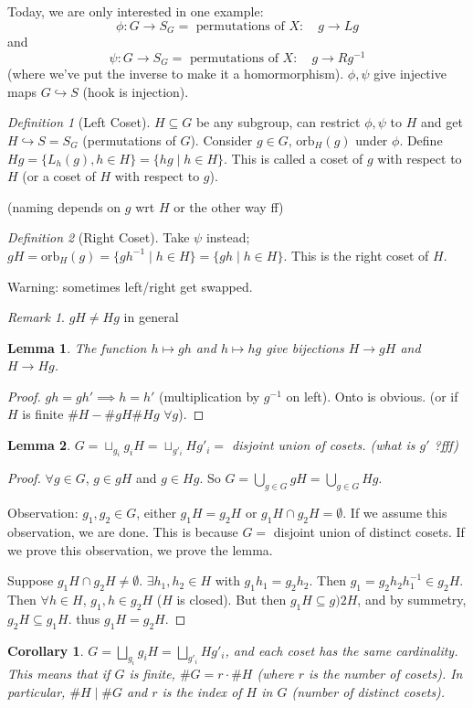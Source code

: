 \documentclass{article}
\theoremstyle{plain}
\newtheorem{lemma}{Lemma}
\newtheorem{corollary}{Corollary}
\theoremstyle{remark}
\newtheorem{definition}{Definition}
\newtheorem{remark}{Remark}
\begin{document}
Today, we are only interested in one example:
\[
	\phi \colon G \to S_G = \text{ permutations of }X: \quad
	g \to Lg
\]
and 
\[
	\psi \colon G \to S_G = \text{ permutations of }X: \quad
	g \to Rg^{-1}
\]
(where we've put the inverse to make it a homormorphism).
$\phi,\psi$ give injective maps $G \hookrightarrow S$ (hook is injection).
\begin{definition}[Left Coset]
	$H \subseteq G$ be any subgroup, can restrict $\phi,\psi$ to $H$
	and get $H \hookrightarrow S = S_G$ (permutations of $G$).
	Consider $g \in G$, $\mathrm{orb}_H(g)$ under $\phi$.
	Define $Hg = \{L_h(g), h \in H\} = \{hg \mid h \in H\}$.
	This is called a coset of $g$ with respect to $H$
	(or a coset of $H$ with respect to $g$).
\end{definition}
(naming depends on $g$ wrt $H$ or the other way ff)
\begin{definition}[Right Coset]
	Take $\psi$ instead; $gH = \mathrm{orb}_H(g) =
	\{gh^{-1} \mid h \in H \} = \{gh \mid h \in H\}$.
	This is the right coset of $H$.
\end{definition}
Warning: sometimes left/right get swapped.
\begin{remark}
	$gH \neq Hg$ in general
\end{remark}
\begin{lemma}
	The function $h \mapsto gh$ and $h \mapsto hg$ give bijections
	$H \to gH$ and $H \to Hg$.
\end{lemma}
\begin{proof}
	$gh = gh' \implies h = h'$ (multiplication by $g^{-1}$ on left).
	Onto is obvious.
	(or if $H$ is finite $\# H - \# gH \# Hg$ $\forall g$).
\end{proof}
\begin{lemma}
	$G = \sqcup_{g_i}g_iH = \sqcup_{g'_i} Hg'_i = $ disjoint union of cosets. (what is $g'$ ?fff)
\end{lemma}
\begin{proof}
	$\forall g \in G$, $g \in gH$ and $g \in Hg$.
	So $G = \bigcup_{g \in G} gH = \bigcup_{g \in G} Hg$.

	Observation: $g_1, g_2 \in G$, either $g_1 H = g_2 H$ or $g_1 H \cap g_2 H = \emptyset$.
	If we assume this observation, we are done.
	This is because $G = $ disjoint union of distinct cosets.
	If we prove this observation, we prove the lemma.

	Suppose $g_1 H \cap g_2 H \neq \emptyset$.
	$\exists h_1, h_2 \in H$ with $g_1h_1 = g_2 h_2$.
	Then $g_1 = g_2 h_2 h_1^{-1} \in g_2 H$.
	Then $\forall h \in H$, $g_1,h \in g_2 H$ ($H$ is closed).
	But then $g_1 H \subseteq g)2 H$, and by summetry, $g_2 H \subseteq g_1 H$.
	thus $g_1 H = g_2 H$.
\end{proof}
\begin{corollary}
	$G = \bigsqcup_{g_i}g_iH = \bigsqcup_{g'_i} Hg'_{i}$,
	and each coset has the same cardinality.
	This means that if $G$ is finite, $\# G = r\cdot \#H$ (where $r$ is the number of cosets).
	In particular, $\# H \mid \# G$ and $r$ is the index of $H$ in $G$
	(number of distinct cosets).
\end{corollary}
\end{document}
